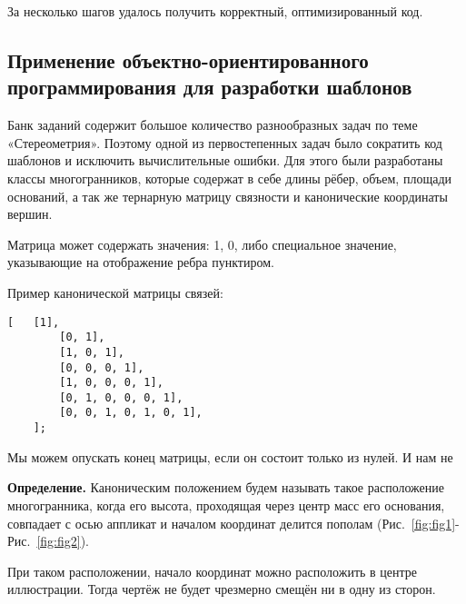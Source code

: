 За несколько шагов удалось получить корректный, оптимизированный код.

\subsection{Применение объектно-ориентированного программирования для разработки шаблонов}


Банк заданий содержит большое количество разнообразных задач по теме «Стереометрия». Поэтому одной из первостепенных задач было сократить код шаблонов и исключить вычислительные ошибки. Для этого были разработаны классы многогранников, которые содержат в себе длины рёбер, объем, площади оснований, а так же тернарную матрицу связности и канонические координаты вершин.

Матрица может содержать значения: 1, 0, либо специальное значение, указывающие на отображение ребра пунктиром.

Пример канонической матрицы связей:

\begin{lstlisting}[caption = {Каноническая матрица связей для параллелепипеда},numbers=none]
	[   [1],
	    [0, 1],
	    [1, 0, 1],
	    [0, 0, 0, 1],
	    [1, 0, 0, 0, 1],
	    [0, 1, 0, 0, 0, 1],
	    [0, 0, 1, 0, 1, 0, 1],
	];
\end{lstlisting}

Мы можем опускать конец матрицы, если он состоит только из нулей. И нам не 

\textbf{Определение.} Каноническим положением будем называть такое расположение многогранника, когда его высота, проходящая через центр масс его основания, совпадает с осью аппликат и началом координат делится пополам (Рис.~\ref{fig:fig1}-Рис.~\ref{fig:fig2}).

При таком расположении, начало координат можно расположить в центре иллюстрации. Тогда чертёж не будет чрезмерно смещён ни в одну из сторон.

